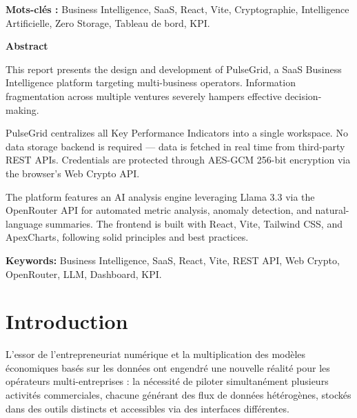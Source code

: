﻿\documentclass[12pt,a4paper,oneside]{report} %
\begin{document}
\vspace{1cm}
\textbf{Mots-clés :} Business Intelligence, SaaS, React, Vite, Cryptographie, Intelligence Artificielle, Zero Storage, Tableau de bord, KPI.

\vspace{2cm}

\begin{center}
    \Large\textbf{Abstract}
\end{center}

This report presents the design and development of PulseGrid, a SaaS Business Intelligence platform targeting multi-business operators. Information fragmentation across multiple ventures severely hampers effective decision-making.

PulseGrid centralizes all Key Performance Indicators into a single workspace. No data storage backend is required — data is fetched in real time from third-party REST APIs. Credentials are protected through AES-GCM 256-bit encryption via the browser's Web Crypto API.

The platform features an AI analysis engine leveraging Llama 3.3 via the OpenRouter API for automated metric analysis, anomaly detection, and natural-language summaries. The frontend is built with React, Vite, Tailwind CSS, and ApexCharts, following solid principles and best practices.

\vspace{1cm}
\textbf{Keywords:} Business Intelligence, SaaS, React, Vite, REST API, Web Crypto, OpenRouter, LLM, Dashboard, KPI.

\newpage
{}
\tableofcontents

\newpage
\listoffigures

\newpage
\listoftables

\newpage
\cleardoublepage
{}

\chapter*{Introduction}

L'essor de l'entrepreneuriat numérique et la multiplication des modèles économiques basés sur les données ont engendré une nouvelle réalité pour les opérateurs multi-entreprises : la nécessité de piloter simultanément plusieurs activités commerciales, chacune générant des flux de données hétérogènes, stockés dans des outils distincts et accessibles via des interfaces différentes.
\end{document}
